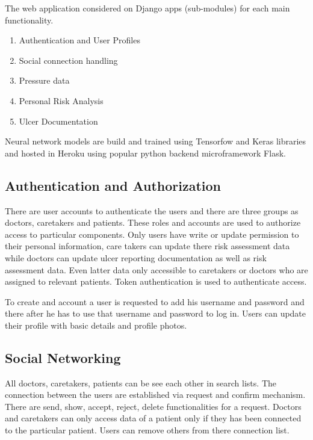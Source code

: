The web application considered on Django apps (sub-modules) for each main functionality.
\begin{enumerate}
	\item Authentication and User Profiles
	\item Social connection handling
	\item Pressure data
	\item Personal Risk Analysis
	\item Ulcer Documentation
\end{enumerate}

Neural network models are build and trained using Tensorfow\textsuperscript{\textregistered} and Keras\textsuperscript{\textregistered} libraries and hosted in Heroku\textsuperscript{\textregistered} using popular python backend microframework Flask\textsuperscript{\textregistered}.


\subsection{Authentication and Authorization}

There are user accounts to authenticate the users and there are three groups as doctors, caretakers and patients. These roles and accounts are used to authorize access to particular components. Only users have write or update permission to their personal information, care takers can update there risk assessment data while doctors can update ulcer reporting documentation as well as risk assessment data. Even latter data only accessible to caretakers or doctors who are assigned to relevant patients. Token authentication is used to authenticate access.

To create and account a user is requested to add his username and password and there after he has to use that username and password to log in. Users can update their profile with basic details and profile photos.

\subsection{Social Networking}

All doctors, caretakers, patients can be see each other in search lists. The connection between the users are established via request and confirm mechanism. There are send, show, accept, reject, delete functionalities for a request. Doctors and caretakers can only access data of a patient only if they has been connected to the particular patient. Users can remove others from there connection list. 

